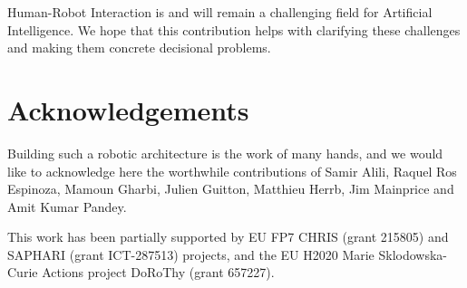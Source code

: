 \documentclass[preprint,3p,times]{elsarticle}
\begin{document}
Human-Robot Interaction is and will remain a challenging field for
Artificial Intelligence. We hope that this contribution helps with clarifying
these challenges and making them concrete decisional problems. 

\section*{Acknowledgements}

Building such a robotic architecture is the work of many hands, and we would
like to acknowledge here the worthwhile contributions of Samir Alili, Raquel Ros
Espinoza, Mamoun Gharbi, Julien Guitton, Matthieu Herrb, Jim Mainprice and Amit
Kumar Pandey.

This work has been partially supported by EU FP7 CHRIS (grant 215805) and
SAPHARI (grant ICT-287513) projects, and the EU H2020 Marie Sklodowska-Curie
Actions project DoRoThy (grant 657227).




%

\end{document}
